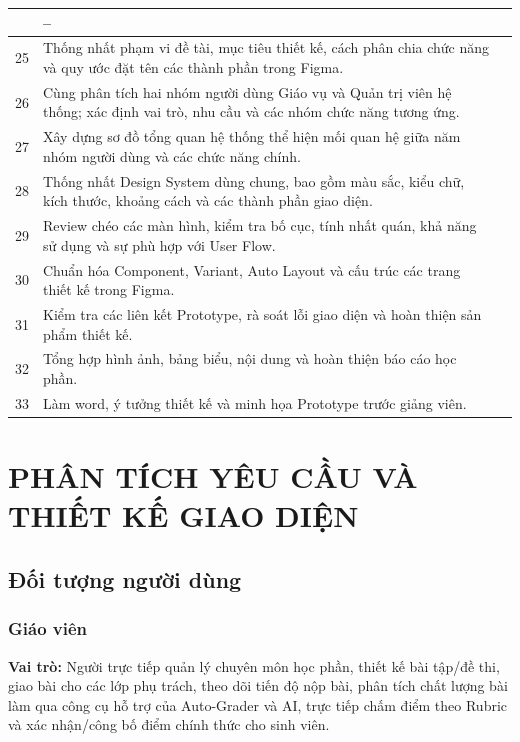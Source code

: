 \documentclass[12pt,a4paper,oneside]{report}
\begin{document}
\begin{longtable}{|>{\centering\arraybackslash}p{1.0cm}|p{11.2cm}|>{\centering\arraybackslash}p{2.0cm}|}
\multicolumn{2}{|>{\raggedright\arraybackslash}p{\dimexpr 1.0cm+11.2cm+2\tabcolsep\relax}|}{\cellcolor{gray!20}\textbf{NHÓM CÔNG VIỆC: CẢ HAI THÀNH VIÊN}} & \multirow{18}{*}{\textbf{--}} \tabularnewline
\cline{1-2}
25 & Thống nhất phạm vi đề tài, mục tiêu thiết kế, cách phân chia chức năng và quy ước đặt tên các thành phần trong Figma. & \tabularnewline
\cline{1-2}
26 & Cùng phân tích hai nhóm người dùng Giáo vụ và Quản trị viên hệ thống; xác định vai trò, nhu cầu và các nhóm chức năng tương ứng. & \tabularnewline
\cline{1-2}
27 & Xây dựng sơ đồ tổng quan hệ thống thể hiện mối quan hệ giữa năm nhóm người dùng và các chức năng chính. & \tabularnewline
\cline{1-2}
28 & Thống nhất Design System dùng chung, bao gồm màu sắc, kiểu chữ, kích thước, khoảng cách và các thành phần giao diện. & \tabularnewline
\cline{1-2}
29 & Review chéo các màn hình, kiểm tra bố cục, tính nhất quán, khả năng sử dụng và sự phù hợp với User Flow. & \tabularnewline
\cline{1-2}
30 & Chuẩn hóa Component, Variant, Auto Layout và cấu trúc các trang thiết kế trong Figma. & \tabularnewline
\cline{1-2}
31 & Kiểm tra các liên kết Prototype, rà soát lỗi giao diện và hoàn thiện sản phẩm thiết kế. & \tabularnewline
\cline{1-2}
32 & Tổng hợp hình ảnh, bảng biểu, nội dung và hoàn thiện báo cáo học phần. & \tabularnewline
\cline{1-2}
33 & Làm word, ý tưởng thiết kế và minh họa Prototype trước giảng viên. & \tabularnewline
\hline
\end{longtable}

\newpage

\chapter{PHÂN TÍCH YÊU CẦU VÀ THIẾT KẾ GIAO DIỆN}

\section{Đối tượng người dùng}

\subsection{Giáo viên}
\textbf{Vai trò:} Người trực tiếp quản lý chuyên môn học phần, thiết kế bài tập/đề thi, giao bài cho các lớp phụ trách, theo dõi tiến độ nộp bài, phân tích chất lượng bài làm qua công cụ hỗ trợ của Auto-Grader và AI, trực tiếp chấm điểm theo Rubric và xác nhận/công bố điểm chính thức cho sinh viên.
\end{document}
